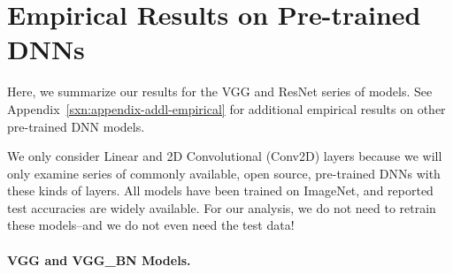 
\section{Empirical Results on Pre-trained DNNs}
\label{sxn:emp}

Here, we summarize our results for the VGG and ResNet series of models.
See Appendix~\ref{sxn:appendix-addl-empirical} for additional empirical results on other pre-trained 
DNN models.

We only consider Linear and 2D Convolutional (Conv2D) layers because we will only examine series of commonly
available, open source, pre-trained DNNs with these kinds of layers.  All models have
been trained on ImageNet, and reported test accuracies are widely available.  For our analysis, we do not need to retrain these
models--and we do not even need the test data!

\paragraph{VGG and VGG\_BN Models.}

